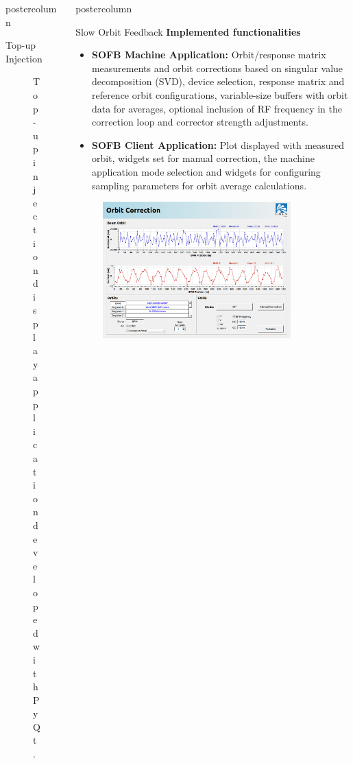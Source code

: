 \documentclass{beamer}
\newlength{\columnheight}
\begin{document}
\begin{frame}
\begin{columns}
\begin{column}{0.45\textwidth}
\begin{beamercolorbox}[center]{postercolumn}
\begin{minipage}{.98\textwidth}
{\begin{myblock}{Top-up Injection}
\begin{figure}
							\caption{Top-up injection display application developed with PyQt.}
						\end{figure}
					\end{myblock}\vfill
		}\end{minipage}\end{beamercolorbox}
	\end{column}
	\begin{column}{.55\textwidth}
		\begin{beamercolorbox}[center]{postercolumn}
			\begin{minipage}{.98\textwidth} %
				\parbox[t][\columnheight]{\textwidth}{ %
					\begin{myblock}{Slow Orbit Feedback}
						\textbf{Implemented functionalities}
						\begin{itemize}
							\item \textbf{SOFB Machine Application:} Orbit/response matrix measurements and orbit corrections based on singular value decomposition (SVD), device selection, response matrix and reference orbit configurations, variable-size buffers with orbit data for averages, optional inclusion of RF frequency in the correction loop and corrector strength adjustments.
							\item \textbf{SOFB Client Application:} Plot displayed with measured orbit, widgets set for manual correction, the machine application mode selection and widgets for configuring sampling parameters for orbit average calculations.
						\end{itemize}
						\vspace{0.5cm}
						\begin{figure}
							\centering
							\includegraphics[width=0.85\textwidth]{../WEPOPRPO22f3.png}

\end{figure}
\end{myblock}}
\end{minipage}
\end{beamercolorbox}
\end{column}
\end{columns}
\end{frame}
\end{document}
